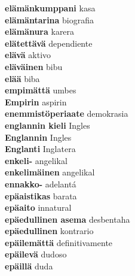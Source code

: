 \textbf{ elämänkumppani  } kasa \\
\textbf{ elämäntarina  } biografia \\
\textbf{ elämänura  } karera \\
\textbf{ elätettävä  } dependiente \\
\textbf{ elävä  } aktivo \\
\textbf{ eläväinen  } bibu \\
\textbf{ elää  } biba \\
\textbf{ empimättä  } umbes \\
\textbf{ Empirin  } aspirin \\
\textbf{ enemmistöperiaate  } demokrasia \\
\textbf{ englannin kieli  } Ingles \\
\textbf{ Englannin  } Ingles \\
\textbf{ Englanti  } Inglatera \\
\textbf{ enkeli-  } angelikal \\
\textbf{ enkelimäinen  } angelikal \\
\textbf{ ennakko-  } adelantá \\
\textbf{ epäaistikas  } barata \\
\textbf{ epäaito  } innatural \\
\textbf{ epäedullinen asema  } desbentaha \\
\textbf{ epäedullinen  } kontrario \\
\textbf{ epäilemättä  } definitivamente \\
\textbf{ epäilevä  } dudoso \\
\textbf{ epäillä  } duda \\
